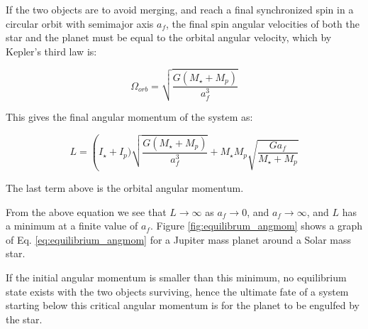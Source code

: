 %
%
%

If the two objects are to avoid merging, and reach a final synchronized spin in
a circular orbit with semimajor axis $a_f$, the final spin angular velocities of
both the star and the planet must be equal to the orbital angular velocity,
which by Kepler's third law is:

\begin{equation}
%
    \Omega_{orb} = \sqrt{\frac{G (M_\star + M_p)}{a_f^3}}
%
\end{equation}

This gives the final angular momentum of the system as:

\begin{equation}
%
    L
%
    =
%
    \left(I_\star + I_p) \sqrt{\frac{G (M_\star + M_p)}{a_f^3}}
%
    +
%
    M_\star M_p \sqrt{\frac{G a_f}{M_\star + M_p}}
%
    \label{eq:equilibrium_angmom}
%
\end{equation}

The last term above is the orbital angular momentum.

From the above equation we see that $L \rightarrow \infty$ as $a_f \rightarrow
0$, and $a_f \rightarrow \infty$, and $L$ has a minimum at a finite value of
$a_f$. Figure \ref{fig:equilibrum_angmom} shows a graph of Eq.
\ref{eq:equilibrium_angmom} for a Jupiter mass planet around a Solar mass star.

If the initial angular momentum is smaller than this minimum, no equilibrium
state exists with the two objects surviving, hence the ultimate fate of a system
starting below this critical angular momentum is for the planet to be engulfed
by the star.
